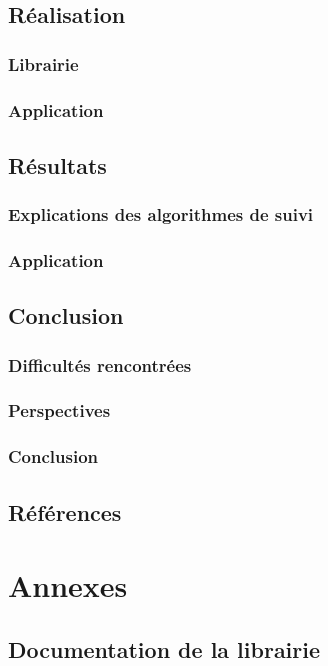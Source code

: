 \documentclass{report}
\begin{document}
	\chapter{Réalisation}
		\section{Librairie}
		\section{Application}
	
	\chapter{Résultats}
		\section{Explications des algorithmes de suivi}
		\section{Application}
	
	\chapter{Conclusion}
		\section{Difficultés rencontrées}
		\section{Perspectives}
		\section{Conclusion}
	
	\chapter{Références}
	
	\part{Annexes}
	\appendix
		\chapter{Documentation de la librairie}	
\end{document}

